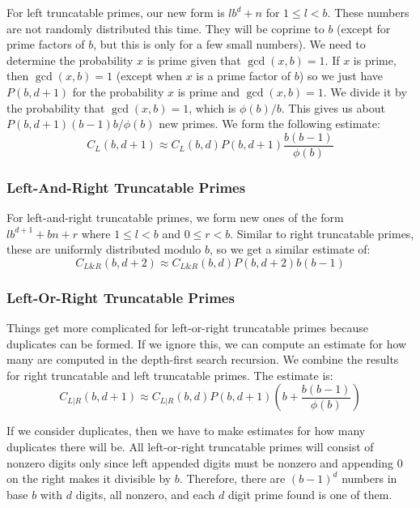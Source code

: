 \documentclass[12pt]{article}
\begin{document}
For left truncatable primes, our new form is $lb^d+n$ for $1\leq l<b$. These numbers are not randomly distributed this time. They will be coprime to $b$ (except for prime factors of $b$, but this is only for a few small numbers). We need to determine the probability $x$ is prime given that $\gcd(x,b)=1$. If $x$ is prime, then $\gcd(x,b)=1$ (except when $x$ is a prime factor of $b$) so we just have $P(b,d+1)$ for the probability $x$ is prime and $\gcd(x,b)=1$. We divide it by the probability that $\gcd(x,b)=1$, which is $\phi(b)/b$. This gives us about $P(b,d+1)(b-1)b/\phi(b)$ new primes. We form the following estimate:
\begin{equation}
C_L(b,d+1) \approx C_L(b,d)P(b,d+1)\frac{b(b-1)}{\phi(b)}
\end{equation}

\subsubsection{Left-And-Right Truncatable Primes}

For left-and-right truncatable primes, we form new ones of the form $lb^{d+1}+bn+r$ where $1\leq l<b$ and $0\leq r<b$. Similar to right truncatable primes, these are uniformly distributed modulo $b$, so we get a similar estimate of:
\begin{equation}
C_{L\&R}(b,d+2) \approx C_{L\&R}(b,d)P(b,d+2)b(b-1)
\end{equation}

\subsubsection{Left-Or-Right Truncatable Primes}

Things get more complicated for left-or-right truncatable primes because duplicates can be formed. If we ignore this, we can compute an estimate for how many are computed in the depth-first search recursion. We combine the results for right truncatable and left truncatable primes. The estimate is:
\begin{equation}
C_{L|R}(b,d+1) \approx C_{L|R}(b,d)P(b,d+1)\left(b+\frac{b(b-1)}{\phi(b)}\right)
\end{equation}

If we consider duplicates, then we have to make estimates for how many duplicates there will be. All left-or-right truncatable primes will consist of nonzero digits only since left appended digits must be nonzero and appending 0 on the right makes it divisible by $b$. Therefore, there are $(b-1)^d$ numbers in base $b$ with $d$ digits, all nonzero, and each $d$ digit prime found is one of them.
\end{document}
